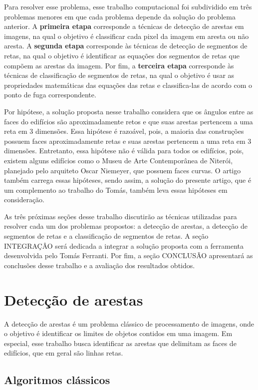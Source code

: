 \documentclass[12pt]{article}
\begin{document}
Para resolver esse problema, esse trabalho computacional foi subdividido em três problemas menores em que cada problema depende da solução do problema anterior. A \textbf{primeira etapa} corresponde a técnicas de detecção de arestas em imagens, na qual o objetivo é classificar cada pixel da imagem em aresta ou não aresta. A \textbf{segunda etapa} corresponde às técnicas de detecção de segmentos de retas, na qual o objetivo é identificar as equações dos segmentos de retas que compõem as arestas da imagem. Por fim, a \textbf{terceira etapa} corresponde às técnicas de classificação de segmentos de retas, na qual o objetivo é usar as propriedades matemáticas das equações das retas e classifica-las de acordo com o ponto de fuga correspondente.

Por hipótese, a solução proposta nesse trabalho considera que os ângulos entre as faces do edifícios são aproximadamente retos e que suas arestas pertencem a uma reta em 3 dimensões. Essa hipótese é razoável, pois, a maioria das construções possuem faces aproximadamente retas e suas arestas pertencem a uma reta em 3 dimensões. Entretanto, essa hipótese não é válida para todos os edifícios, pois, existem alguns edifícios como o Museu de Arte Contemporânea de Niterói, planejado pelo arquiteto Oscar Niemeyer, que possuem faces curvas. O artigo \cite{Ferranti2021} também carrega essas hipóteses, sendo assim, a solução do presente artigo, que é um complemento ao trabalho do Tomás, também leva essas hipóteses em consideração.


As três próximas seções desse trabalho discutirão as técnicas utilizadas para resolver cada um dos problemas propostos: a detecção de arestas, a detecção de segmentos de retas e a classificação de segmentos de retas. A seção INTEGRAÇÂO será dedicada a integrar a solução proposta com a ferramenta desenvolvida pelo Tomás Ferranti. Por fim, a seção CONCLUSÃO apresentará as conclusões desse trabalho e a avaliação dos resultados obtidos.

\section{Detecção de arestas}

A detecção de arestas é um problema clássico de processamento de imagens, onde o objetivo é identificar os limites de objetos contidos em uma imagem. Em especial, esse trabalho busca identificar as arestas que delimitam as faces de edifícios, que em geral são linhas retas. 

\subsection{Algoritmos clássicos}
\end{document}

